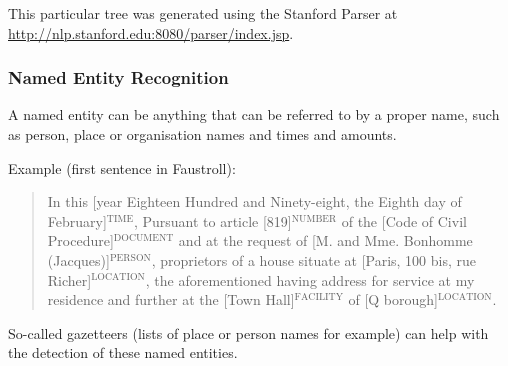 This particular tree was generated using the Stanford Parser at \url{http://nlp.stanford.edu:8080/parser/index.jsp}.


\subsubsection{Named Entity Recognition}

A named entity can be anything that can be referred to by a proper name, such as person, place or organisation names and times and amounts.

Example (first sentence in Faustroll):

\begin{quote}
  In this [year Eighteen Hundred and Ninety-eight, the Eighth day of February]$^{\text{TIME}}$, Pursuant to article [819]$^{\text{NUMBER}}$ of the [Code of Civil Procedure]$^{\text{DOCUMENT}}$ and at the request of [M. and Mme. Bonhomme (Jacques)]$^{\text{PERSON}}$, proprietors of a house situate at [Paris, 100 bis, rue Richer]$^{\text{LOCATION}}$, the aforementioned having address for service at my residence and further at the [Town Hall]$^{\text{FACILITY}}$ of [Q borough]$^{\text{LOCATION}}$.
\end{quote}

So-called gazetteers (lists of place or person names for example) can help with the detection of these named entities.


\stopcontents[chapters]
